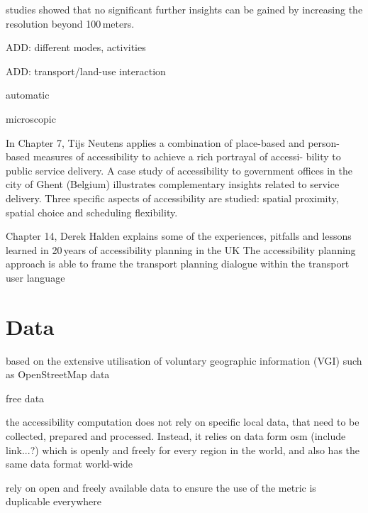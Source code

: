 studies showed that no significant further insights can be gained by increasing the resolution beyond 100\,meters.

ADD: different modes, activities

ADD: transport/land-use interaction

automatic

microscopic




In Chapter 7, Tijs Neutens applies a combination of place-based and person-based measures of accessibility to achieve 
a rich portrayal of accessi- bility to public service delivery. A case study of accessibility to government offices 
in the city of Ghent (Belgium) illustrates complementary insights related to service delivery. Three specific aspects 
of accessibility are studied: spatial proximity, spatial choice and scheduling flexibility.

Chapter 14, Derek Halden explains some of the experiences, pitfalls and lessons learned in 20\,years of accessibility 
planning in the UK The accessibility planning approach is able to frame the transport planning dialogue within 
the transport user language 


\section{Data}
based on the extensive utilisation of voluntary
geographic information (VGI) such as OpenStreetMap data

free data

the accessibility computation does not rely on specific local data, that need to be collected, prepared and processed. 
Instead, it relies on data form \gls{osm} (include link...?) which is openly and freely for every region in the world, 
and also has the same data format world-wide

rely on open and freely available data to ensure the use of the metric is duplicable everywhere

